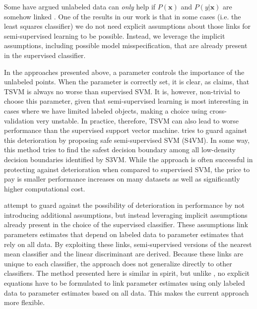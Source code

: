 \documentclass{elsarticle}
\begin{document}
Some have argued unlabeled data can \emph{only} help if $P(\mathbf{x})$ and $P(y|\mathbf{x})$ are somehow linked \cite{Singh2008}.
One of the results in our work is that in some cases (i.e. the least squares classifier) we do not need explicit assumptions about those links for semi-supervised learning to be possible. 
Instead, we leverage the implicit assumptions, including possible model misspecification, that are already present in the supervised classifier.

In the approaches presented above, a parameter controls the importance of the unlabeled points. When the parameter is correctly set, it is clear, as \cite{Wang2007a} claims, that TSVM is always no worse than supervised SVM. 
It is, however, non-trivial to choose this parameter, given that semi-supervised learning is most interesting in cases where we have limited labeled objects, making a choice using cross-validation very unstable. 
In practice, therefore, TSVM can also lead to worse performance than the supervised support vector machine. 
\cite{Li2011} tries to guard against this deterioration by proposing safe semi-supervised SVM (S4VM). 
In some way, this method tries to find the safest decision boundary among all low-density decision boundaries identified by S3VM. 
While the approach is often successful in protecting against deterioration when compared to supervised SVM, the price to pay is smaller performance increases on many datasets as well as significantly higher computational cost.

\cite{Loog2014b,Loog2014a} attempt to guard against the possibility of deterioration in performance by not introducing additional assumptions, but instead leveraging implicit assumptions already present in the choice of the supervised classifier. 
These assumptions link parameters estimates that depend on labeled data to parameter estimates that rely on all data. 
By exploiting these links, semi-supervised versions of the nearest mean classifier and the linear discriminant are derived. 
Because these links are unique to each classifier, the approach does not generalize directly to other classifiers. 
The method presented here is similar in spirit, but unlike \cite{Loog2014b,Loog2014a}, no explicit equations have to be formulated to link parameter estimates using only labeled data to parameter estimates based on all data. 
This makes the current approach more flexible.
\end{document}
